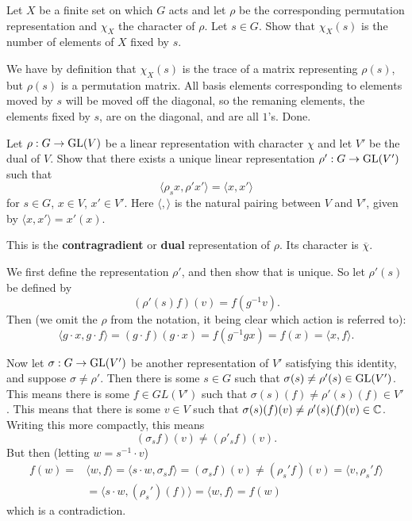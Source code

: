 \documentclass[11pt, english]{article}
\begin{document}
\begin{exc}[Exercise 2.2]
  Let $X$ be a finite set on which $G$ acts and let $\rho$ be the corresponding permutation representation and $\chi_X$ the character of $\rho$. Let $s \in G$. Show that $\chi_X(s)$ is the number of elements of $X$ fixed by $s$.
\end{exc}

\begin{sol}
 We have by definition that $\chi_X(s)$ is the trace of a matrix representing $\rho(s)$, but $\rho(s)$ is a permutation matrix. All basis elements corresponding to elements moved by $s$ will be moved off the diagonal, so the remaning elements, the elements fixed by $s$, are on the diagonal, and are all $1$'s. Done.
\end{sol}

\begin{exc}[Excercise 2.3]
Let $\rho:G \to \operatorname{GL}(V)$ be a linear representation with character $\chi$ and let $V'$ be the dual of $V$. Show that there exists a unique linear representation $\rho':G \to \operatorname{GL}(V')$ such that
$$
\langle \rho_s x, \rho' x' \rangle = \langle x, x' \rangle
$$  
for $s \in G$, $x \in V$, $x' \in V'$. Here $\langle,\rangle$ is the natural pairing between $V$ and $V'$, given by $\langle x,x' \rangle = x'(x)$. 

This is the \textbf{contragradient} or \textbf{dual} representation of $\rho$. Its character is $\overline \chi$.
\end{exc}

\begin{sol}
  We first define the representation $\rho'$, and then show that is unique. So let $\rho'(s)$ be defined by
$$
(\rho'(s) f)(v) = f(g^{-1} v).
$$
Then (we omit the $\rho$ from the notation, it being clear which action is referred to):
$$
\langle g \cdot x, g \cdot f \rangle = (g \cdot f)(g \cdot x) = f(g^{-1} gx ) = f(x) = \langle x, f \rangle.
$$

Now let $\sigma:G \to \operatorname{GL}(V')$ be another representation of $V'$ satisfying this identity, and suppose $\sigma \neq \rho'$. Then there is some $s \in G$ such that $\sigma(s) \neq \rho'(s) \in \operatorname{GL}(V')$. This means there is some $f \in GL(V')$ such that $\sigma(s)(f) \neq \rho'(s)(f) \in V'$. This means that there is some $v \in V$ such that $\sigma(s)(f)(v) \neq \rho'(s)(f)(v) \in \mathbb{C}$. Writing this more compactly, this means
$$
(\sigma_s f)(v) \neq (\rho'_s f)(v).
$$
But then (letting $w = s^{-1} \cdot v$)
\begin{align*}
f(w) =& \langle w,f\rangle = \langle s \cdot w, \sigma_s f \rangle= ( \sigma_s 
f)(v) \neq (\rho_s' f)(v) = \langle v, \rho_s' f \rangle \\
&= \langle s \cdot w, (\rho_s')(f) \rangle = \langle w, f \rangle = f(w)
\end{align*}
which is a contradiction.
\end{sol}
\end{document}
